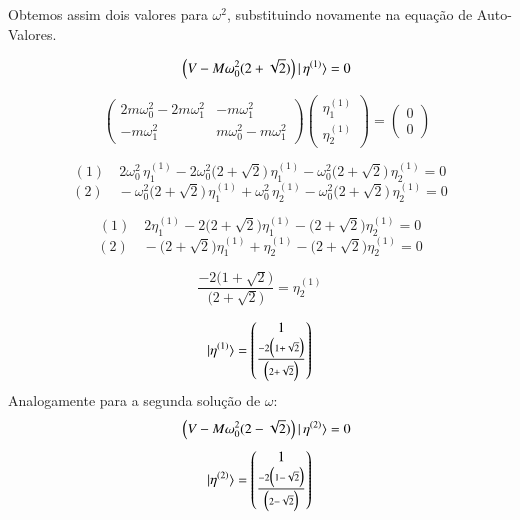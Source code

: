 \documentclass[a4paper,11pt]{exam}
\begin{document}
	Obtemos assim dois valores para $\omega^2$, substituindo novamente na equação de Auto-Valores.
	
	\[   \quad \Big(V-M\omega_0^2(2+\sqrt{2})\Big)\ket{\,\eta^{(1)}} = 0 \]
	
	\[	\quad \begin{pmatrix}
			2m\omega_0^2 - 2m\omega_1^2 & -m\omega_1^2 \\
			-m\omega_1^2 & m\omega_0^2 - m\omega_1^2
		\end{pmatrix}
		\begin{pmatrix}
			\eta_1^{(1)}\\
			\eta_2^{(1)}
		\end{pmatrix} = 
		\begin{pmatrix}
			0\\
			0
		\end{pmatrix}	\]
	
     \[(1) \quad  2\omega_0^2 \, \eta_1^{(1)} - 2\omega_0^2\Big(2 + \sqrt{2}\Big) \, \eta_1^{(1)} - \omega_0^2\Big(2 + \sqrt{2}\Big) \, \eta_2^{(1)} =0\]
	\[(2) \quad  -\omega_0^2\Big(2 + \sqrt{2}\Big) \, \eta_1^{(1)} +  \omega_0^2 \, \eta_2^{(1)} - \omega_0^2\Big(2 + \sqrt{2}\Big) \, \eta_2^{(1)}  = 0\]
	
	\[(1) \quad  2 \eta_1^{(1)}-2\Big(2 + \sqrt{2}\Big) \eta_1^{(1)} -\Big(2 + \sqrt{2}\Big) \eta_2^{(1)} =0\]
	\[(2) \quad  -\Big(2 + \sqrt{2}\Big) \eta_1^{(1)} + \eta_2^{(1)} - \Big(2 + \sqrt{2}\Big) \eta_2^{(1)}  = 0\]
	
	\[\frac{-2(1 + \sqrt{2}\Big)}{\Big(2 + \sqrt{2}\Big) }  = \eta_2^{(1)} \]
		
	\[\ket{\eta^{(1)}} = \begin{pmatrix}
			1\\
			\frac{-2\Big(1 + \sqrt{2}\Big)}{\Big(2 + \sqrt{2}\Big)}
	  \end{pmatrix}
	\]
	Analogamente para a segunda solução de $\omega$:
	\[ \quad \Big(V-M\omega_0^2(2-\sqrt{2})\Big)\ket{\,\eta^{(2)}} = 0 \]
	\[\ket{\eta^{(2)}} = \begin{pmatrix}
			1\\
			\frac{-2\Big(1 - \sqrt{2}\Big)}{\Big(2 - \sqrt{2}\Big)}
	  \end{pmatrix}
	\]
	
	
	
	
\end{document}
